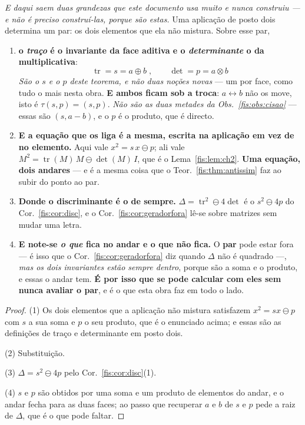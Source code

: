 \documentclass[livro.tex]{subfiles}
\begin{document}
\begin{corolario}\label{fis:cor:trdet}
\emph{E daqui saem duas grandezas que este documento usa muito e nunca construiu ---
e não é preciso construí-las, porque são estas.} Uma aplicação de posto dois
determina um par: os dois elementos que ela não mistura. Sobre esse par,
\begin{enumerate}\itemsep3pt
\item[(1)] \textbf{o \emph{traço} é o invariante da face aditiva e o
\emph{determinante} o da multiplicativa}:
\[
\boxed{\;\operatorname{tr}=s=a\oplus b\;,\qquad \det=p=a\otimes b\;}
\]
\emph{São o $s$ e o $p$ deste teorema, e não duas noções novas} --- um por face,
como tudo o mais nesta obra. \textbf{E ambos ficam sob a troca}: $a\leftrightarrow b$
não os move, isto é $\tau(s,p)=(s,p)$. \emph{Não são as duas metades da
Obs.~\ref{fis:obs:cisao}} --- essas são $(s,a-b)$, e o $p$ é o produto, que é
directo.
\item[(2)] \textbf{E a equação que os liga é a mesma, escrita na aplicação em vez
de no elemento.} Aqui vale $x^{2}=s\,x\ominus p$; ali vale
$M^{2}=\operatorname{tr}(M)\,M\ominus\det(M)\,I$, que é o
Lema~\ref{fis:lem:ch2}. \textbf{Uma equação, dois andares} --- e é a mesma coisa
que o Teor.~\ref{fis:thm:antissim} faz ao subir do ponto ao par.
\item[(3)] \textbf{Donde o discriminante é o de sempre.}
$\Delta=\operatorname{tr}^{2}\ominus4\det$ é o $s^{2}\ominus4p$ do
Cor.~\ref{fis:cor:disc}, e o Cor.~\ref{fis:cor:geradorfora} lê-se sobre matrizes
sem mudar uma letra.
\item[(4)] \textbf{E note-se \emph{o que} fica no andar e o que não fica.} O
\textbf{par} pode estar fora --- é isso que o Cor.~\ref{fis:cor:geradorfora} diz
quando $\Delta$ não é quadrado ---, \emph{mas os dois invariantes estão sempre
dentro}, porque são a soma e o produto, e essas o andar tem. \textbf{É por isso
que se pode calcular com eles sem nunca avaliar o par}, e é o que esta obra faz
em todo o lado.
\end{enumerate}
\end{corolario}

\begin{proof}
(1) Os dois elementos que a aplicação não mistura satisfazem $x^{2}=sx\ominus p$
com $s$ a sua soma e $p$ o seu produto, que é o enunciado acima; e essas são as
definições de traço e determinante em posto dois.

(2) Substituição.

(3) $\Delta=s^{2}\ominus4p$ pelo Cor.~\ref{fis:cor:disc}(1).

(4) $s$ e $p$ são obtidos por uma soma e um produto de elementos do andar, e o
andar fecha para as duas faces; ao passo que recuperar $a$ e $b$ de $s$ e $p$ pede
a raiz de $\Delta$, que é o que pode faltar.
\end{proof}
\end{document}
